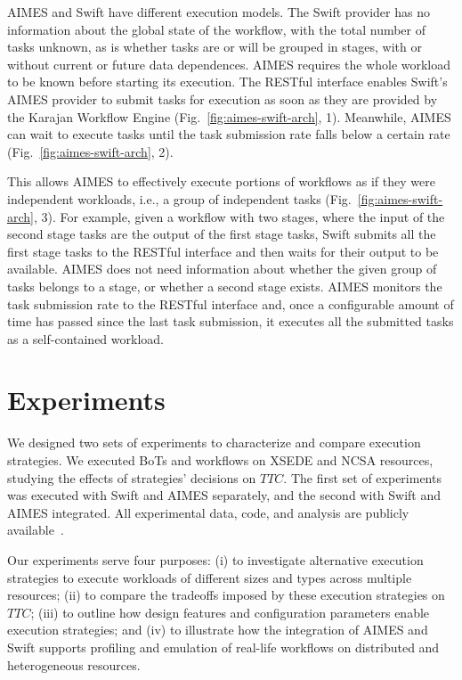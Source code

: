 \documentclass[10pt, conference, compsocconf]{IEEEtran}
\begin{document}
AIMES and Swift have different execution models. The Swift provider has no
information about the global state of the workflow, with the total number of
tasks unknown, as is whether tasks are or will be grouped in stages, with or
without current or future data dependences. AIMES requires the whole workload
to be known before starting its execution. The RESTful interface enables
Swift's AIMES provider to submit tasks for execution as soon as they are
provided by the Karajan Workflow Engine (Fig.~\ref{fig:aimes-swift-arch}, 1).
Meanwhile, AIMES can wait to execute tasks until the task submission rate
falls below a certain rate (Fig.~\ref{fig:aimes-swift-arch}, 2).

This allows AIMES to effectively execute portions of workflows as if they
were independent workloads, i.e., a group of independent tasks
(Fig.~\ref{fig:aimes-swift-arch}, 3). For example, given a workflow with two
stages, where the input of the second stage tasks are the output of the first
stage tasks, Swift submits all the first stage tasks to the RESTful interface
and then waits for their output to be available. AIMES does not need
information about whether the given group of tasks belongs to a stage, or
whether a second stage exists. AIMES monitors the task submission rate to the
RESTful interface and, once a configurable amount of time has passed since
the last task submission, it executes all the submitted tasks as a
self-contained workload.


\section{Experiments}\label{sec:exp}

We designed two sets of experiments to characterize and compare execution
strategies. We executed BoTs and workflows on XSEDE and NCSA resources,
studying the effects of strategies' decisions on \(TTC\). The first set of
experiments was executed with Swift and AIMES separately, and the second with
Swift and AIMES integrated. All experimental data, code, and analysis are
publicly available~\cite{aimes_swift_experiments_url}.

Our experiments serve four purposes: (i) to investigate alternative execution
strategies to execute workloads of different sizes and types across multiple
resources; (ii) to compare the tradeoffs imposed by these execution
strategies on \(TTC\); (iii) to outline how design features and configuration
parameters enable execution strategies; and (iv) to illustrate how the
integration of AIMES and Swift supports profiling and emulation of real-life
workflows on distributed and heterogeneous resources.
\end{document}
